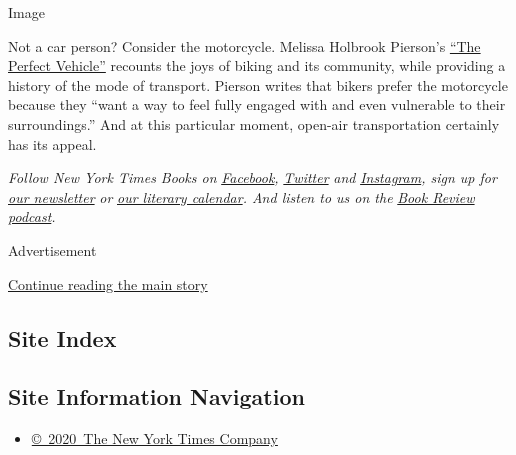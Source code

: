 Image

Not a car person? Consider the motorcycle. Melissa Holbrook Pierson's
\href{https://www.nytimes.com/1998/03/01/books/books-in-brief-nonfiction-672262.html}{``The
Perfect Vehicle''} recounts the joys of biking and its community, while
providing a history of the mode of transport. Pierson writes that bikers
prefer the motorcycle because they ``want a way to feel fully engaged
with and even vulnerable to their surroundings.'' And at this particular
moment, open-air transportation certainly has its appeal.

\emph{Follow New York Times Books on}
\href{https://www.facebook.com/nytbooks/}{\emph{Facebook}}\emph{,}
\href{https://twitter.com/nytimesbooks}{\emph{Twitter}} \emph{and}
\href{https://www.instagram.com/nytbooks/}{\emph{Instagram}}\emph{, sign
up for}
\href{https://www.nytimes.com/newsletters/books-review}{\emph{our
newsletter}} \emph{or}
\href{https://www.nytimes.com/interactive/2017/books/books-calendar.html}{\emph{our
literary calendar}}\emph{. And listen to us on the}
\href{https://www.nytimes.com/column/book-review-podcast}{\emph{Book
Review podcast}}\emph{.}

Advertisement

\protect\hyperlink{after-bottom}{Continue reading the main story}

\hypertarget{site-index}{%
\subsection{Site Index}\label{site-index}}

\hypertarget{site-information-navigation}{%
\subsection{Site Information
Navigation}\label{site-information-navigation}}

\begin{itemize}
\tightlist
\item
  \href{https://help.nytimes.com/hc/en-us/articles/115014792127-Copyright-notice}{©~2020~The
  New York Times Company}
\end{itemize}

